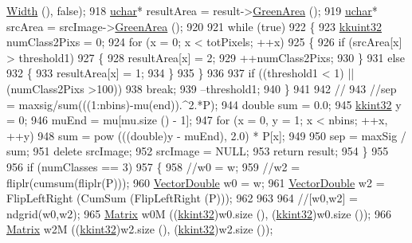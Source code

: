 \begin{DoxyCode}
{{{{{{{{{{{{{{{{{{{{{{{{{{{{{{{{{{{{{{{{{{{{{{{{{{{      \hyperlink{class_k_k_b_1_1_raster_aa2780c0b7ae75b7b595f99329689c1f6}{Width} (), \textcolor{keyword}{false});
918     \hyperlink{namespace_k_k_b_ace9969169bf514f9ee6185186949cdf7}{uchar}*  resultArea = result->\hyperlink{class_k_k_b_1_1_raster_af6ceacfa7835a295d239d141627dbec7}{GreenArea} ();
919     \hyperlink{namespace_k_k_b_ace9969169bf514f9ee6185186949cdf7}{uchar}*  srcArea    = srcImage->\hyperlink{class_k_k_b_1_1_raster_af6ceacfa7835a295d239d141627dbec7}{GreenArea} ();
920 
921     \textcolor{keywordflow}{while}  (\textcolor{keyword}{true})
922     \{
923       \hyperlink{namespace_k_k_b_af8d832f05c54994a1cce25bd5743e19a}{kkuint32}  numClass2Pixs = 0;
924       \textcolor{keywordflow}{for}  (x = 0;  x < totPixels;  ++x)
925       \{
926         \textcolor{keywordflow}{if}  (srcArea[x] > threshold1)
927         \{
928           resultArea[x] = 2;
929           ++numClass2Pixs;
930         \}
931         \textcolor{keywordflow}{else}
932         \{
933           resultArea[x] = 1;
934         \}
935       \}
936 
937       \textcolor{keywordflow}{if}  ((threshold1 < 1)  ||  (numClass2Pixs >100))
938         \textcolor{keywordflow}{break};
939       --threshold1;
940     \}
941     
942     \textcolor{comment}{//%
943     \textcolor{comment}{//sep = maxsig/sum(((1:nbins)-mu(end)).^2.*P);}
944     \textcolor{keywordtype}{double}  sum = 0.0;
945     \hyperlink{namespace_k_k_b_a8fa4952cc84fda1de4bec1fbdd8d5b1b}{kkint32}  y = 0;
946     muEnd = mu[mu.size () - 1];
947     \textcolor{keywordflow}{for}  (x = 0, y = 1;  x < nbins;  ++x, ++y)
948       sum = pow (((\textcolor{keywordtype}{double})y - muEnd), 2.0) * P[x];
949 
950     sep = maxSig / sum;
951     \textcolor{keyword}{delete}  srcImage;
952     srcImage = NULL;
953     \textcolor{keywordflow}{return}  result;
954   \}
955     
956   \textcolor{keywordflow}{if}  (numClasses == 3)
957   \{
958     \textcolor{comment}{//w0 = w;}
959     \textcolor{comment}{//w2 = fliplr(cumsum(fliplr(P)));}
960     \hyperlink{namespace_k_k_b_a5906c207479607e5f450434095914a41}{VectorDouble}  w0 = w;
961     \hyperlink{namespace_k_k_b_a5906c207479607e5f450434095914a41}{VectorDouble}  w2 = FlipLeftRight (CumSum (FlipLeftRight (P)));
962 
963 
964     \textcolor{comment}{//[w0,w2] = ndgrid(w0,w2);}
965     \hyperlink{class_k_k_b_1_1_matrix}{Matrix} w0M ((\hyperlink{namespace_k_k_b_a8fa4952cc84fda1de4bec1fbdd8d5b1b}{kkint32})w0.size (), (\hyperlink{namespace_k_k_b_a8fa4952cc84fda1de4bec1fbdd8d5b1b}{kkint32})w0.size ());
966     \hyperlink{class_k_k_b_1_1_matrix}{Matrix} w2M ((\hyperlink{namespace_k_k_b_a8fa4952cc84fda1de4bec1fbdd8d5b1b}{kkint32})w2.size (), (\hyperlink{namespace_k_k_b_a8fa4952cc84fda1de4bec1fbdd8d5b1b}{kkint32})w2.size ());
}}}}}}}}}}}}}}}}}}}}}}}}}}}}}}}}}}}}}}}}}}}}}}}}}}}}
\end{DoxyCode}
